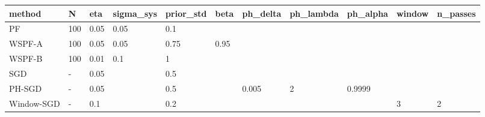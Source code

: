 \begin{tabular}{lllllllllll}
\hline
method & N & eta & sigma\_sys & prior\_std & beta & ph\_delta & ph\_lambda & ph\_alpha & window & n\_passes \\
\hline
PF & 100 & 0.05 & 0.05 & 0.1 &  &  &  &  &  &  \\
WSPF-A & 100 & 0.05 & 0.05 & 0.75 & 0.95 &  &  &  &  &  \\
WSPF-B & 100 & 0.01 & 0.1 & 1 &  &  &  &  &  &  \\
SGD & - & 0.05 &  & 0.5 &  &  &  &  &  &  \\
PH-SGD & - & 0.05 &  & 0.5 &  & 0.005 & 2 & 0.9999 &  &  \\
Window-SGD & - & 0.1 &  & 0.2 &  &  &  &  & 3 & 2 \\
\hline
\end{tabular}
